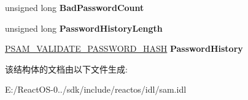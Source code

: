 \begin{DoxyCompactItemize}
unsigned long {\bfseries Bad\+Password\+Count}
\item 
\mbox{\label{struct___s_a_m___v_a_l_i_d_a_t_e___p_e_r_s_i_s_t_e_d___f_i_e_l_d_s_a30af28fb5759c280b542bc84e7c2980a}} 
unsigned long {\bfseries Password\+History\+Length}
\item 
\mbox{\label{struct___s_a_m___v_a_l_i_d_a_t_e___p_e_r_s_i_s_t_e_d___f_i_e_l_d_s_a9c1f09c7997c4b23e2db5293c1dd6452}} 
\hyperlink{struct___s_a_m___v_a_l_i_d_a_t_e___p_a_s_s_w_o_r_d___h_a_s_h}{P\+S\+A\+M\+\_\+\+V\+A\+L\+I\+D\+A\+T\+E\+\_\+\+P\+A\+S\+S\+W\+O\+R\+D\+\_\+\+H\+A\+SH} {\bfseries Password\+History}
\end{DoxyCompactItemize}


该结构体的文档由以下文件生成\+:\begin{DoxyCompactItemize}
\item 
E\+:/\+React\+O\+S-\/0../sdk/include/reactos/idl/sam.\+idl\end{DoxyCompactItemize}
